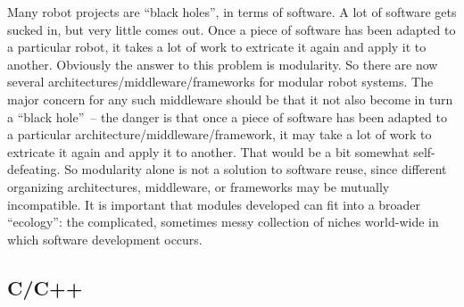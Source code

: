 Many robot projects are ``black holes'', in terms of software.  A lot
of software gets sucked in, but very little comes out.  Once a piece
of software has been adapted to a particular robot, it takes a lot
of work to extricate it again and apply it to another.
%
Obviously the answer to this problem is modularity.  So there are 
now several architectures/middleware/frameworks for modular robot systems.
The major concern for any such middleware should be that it not 
also become
in turn a ``black hole''~-- the
danger is that once a piece of software has been adapted
to a particular architecture/middleware/framework, it may take a lot of work to extricate it
again and apply it to another.  That would be a bit somewhat self-defeating.
%
So modularity alone is not a solution to software reuse, since 
different organizing architectures, middleware, or frameworks may be mutually
incompatible.  It is important that modules developed can fit
into a broader ``ecology'': the  complicated, sometimes messy
collection of niches world-wide in which software development occurs.






\subsection{C/C++}

